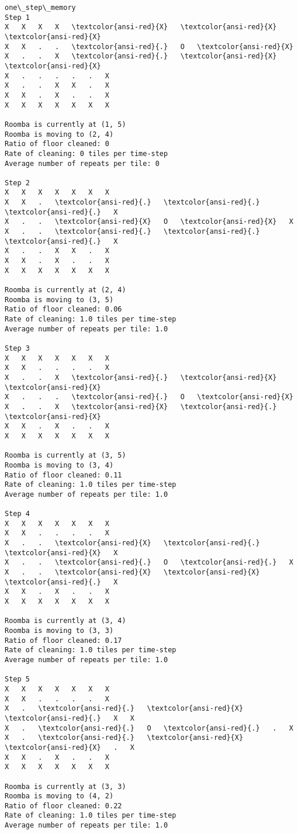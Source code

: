 \documentclass[11pt]{article}
\begin{document}
    \begin{Verbatim}[commandchars=\\\{\},fontsize=\footnotesize]
one\_step\_memory
Step 1
X   X   X   X   \textcolor{ansi-red}{X}   \textcolor{ansi-red}{X}   \textcolor{ansi-red}{X}
X   X   .   .   \textcolor{ansi-red}{.}   O   \textcolor{ansi-red}{X}
X   .   .   X   \textcolor{ansi-red}{.}   \textcolor{ansi-red}{X}   \textcolor{ansi-red}{X}
X   .   .   .   .   .   X
X   .   .   X   X   .   X
X   X   .   X   .   .   X
X   X   X   X   X   X   X

Roomba is currently at (1, 5)
Roomba is moving to (2, 4)
Ratio of floor cleaned: 0
Rate of cleaning: 0 tiles per time-step
Average number of repeats per tile: 0

Step 2
X   X   X   X   X   X   X
X   X   .   \textcolor{ansi-red}{.}   \textcolor{ansi-red}{.}   \textcolor{ansi-red}{.}   X
X   .   .   \textcolor{ansi-red}{X}   O   \textcolor{ansi-red}{X}   X
X   .   .   \textcolor{ansi-red}{.}   \textcolor{ansi-red}{.}   \textcolor{ansi-red}{.}   X
X   .   .   X   X   .   X
X   X   .   X   .   .   X
X   X   X   X   X   X   X

Roomba is currently at (2, 4)
Roomba is moving to (3, 5)
Ratio of floor cleaned: 0.06
Rate of cleaning: 1.0 tiles per time-step
Average number of repeats per tile: 1.0

Step 3
X   X   X   X   X   X   X
X   X   .   .   .   .   X
X   .   .   X   \textcolor{ansi-red}{.}   \textcolor{ansi-red}{X}   \textcolor{ansi-red}{X}
X   .   .   .   \textcolor{ansi-red}{.}   O   \textcolor{ansi-red}{X}
X   .   .   X   \textcolor{ansi-red}{X}   \textcolor{ansi-red}{.}   \textcolor{ansi-red}{X}
X   X   .   X   .   .   X
X   X   X   X   X   X   X

Roomba is currently at (3, 5)
Roomba is moving to (3, 4)
Ratio of floor cleaned: 0.11
Rate of cleaning: 1.0 tiles per time-step
Average number of repeats per tile: 1.0

Step 4
X   X   X   X   X   X   X
X   X   .   .   .   .   X
X   .   .   \textcolor{ansi-red}{X}   \textcolor{ansi-red}{.}   \textcolor{ansi-red}{X}   X
X   .   .   \textcolor{ansi-red}{.}   O   \textcolor{ansi-red}{.}   X
X   .   .   \textcolor{ansi-red}{X}   \textcolor{ansi-red}{X}   \textcolor{ansi-red}{.}   X
X   X   .   X   .   .   X
X   X   X   X   X   X   X

Roomba is currently at (3, 4)
Roomba is moving to (3, 3)
Ratio of floor cleaned: 0.17
Rate of cleaning: 1.0 tiles per time-step
Average number of repeats per tile: 1.0

Step 5
X   X   X   X   X   X   X
X   X   .   .   .   .   X
X   .   \textcolor{ansi-red}{.}   \textcolor{ansi-red}{X}   \textcolor{ansi-red}{.}   X   X
X   .   \textcolor{ansi-red}{.}   O   \textcolor{ansi-red}{.}   .   X
X   .   \textcolor{ansi-red}{.}   \textcolor{ansi-red}{X}   \textcolor{ansi-red}{X}   .   X
X   X   .   X   .   .   X
X   X   X   X   X   X   X

Roomba is currently at (3, 3)
Roomba is moving to (4, 2)
Ratio of floor cleaned: 0.22
Rate of cleaning: 1.0 tiles per time-step
Average number of repeats per tile: 1.0


    \end{Verbatim}
\end{document}
